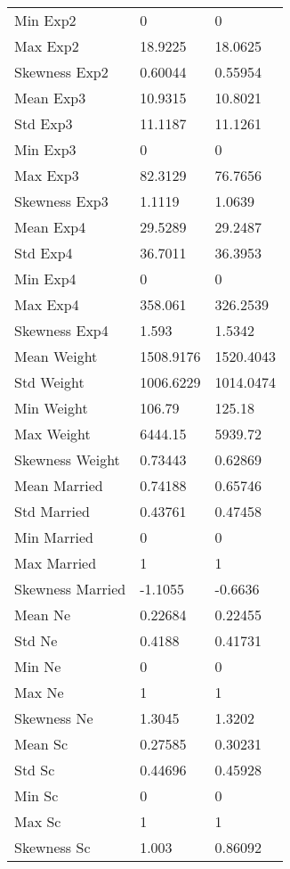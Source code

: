 \begin{tabular}{lll}
Min Exp2 & 0 & 0 \\ 
Max Exp2 & 18.9225 & 18.0625 \\ 
Skewness Exp2 & 0.60044 & 0.55954 \\ 
Mean Exp3 & 10.9315 & 10.8021 \\ 
Std Exp3 & 11.1187 & 11.1261 \\ 
Min Exp3 & 0 & 0 \\ 
Max Exp3 & 82.3129 & 76.7656 \\ 
Skewness Exp3 & 1.1119 & 1.0639 \\ 
Mean Exp4 & 29.5289 & 29.2487 \\ 
Std Exp4 & 36.7011 & 36.3953 \\ 
Min Exp4 & 0 & 0 \\ 
Max Exp4 & 358.061 & 326.2539 \\ 
Skewness Exp4 & 1.593 & 1.5342 \\ 
Mean Weight & 1508.9176 & 1520.4043 \\ 
Std Weight & 1006.6229 & 1014.0474 \\ 
Min Weight & 106.79 & 125.18 \\ 
Max Weight & 6444.15 & 5939.72 \\ 
Skewness Weight & 0.73443 & 0.62869 \\ 
Mean Married & 0.74188 & 0.65746 \\ 
Std Married & 0.43761 & 0.47458 \\ 
Min Married & 0 & 0 \\ 
Max Married & 1 & 1 \\ 
Skewness Married & -1.1055 & -0.6636 \\ 
Mean Ne & 0.22684 & 0.22455 \\ 
Std Ne & 0.4188 & 0.41731 \\ 
Min Ne & 0 & 0 \\ 
Max Ne & 1 & 1 \\ 
Skewness Ne & 1.3045 & 1.3202 \\ 
Mean Sc & 0.27585 & 0.30231 \\ 
Std Sc & 0.44696 & 0.45928 \\ 
Min Sc & 0 & 0 \\ 
Max Sc & 1 & 1 \\ 
Skewness Sc & 1.003 & 0.86092 \\ 
\hline 
\end{tabular}